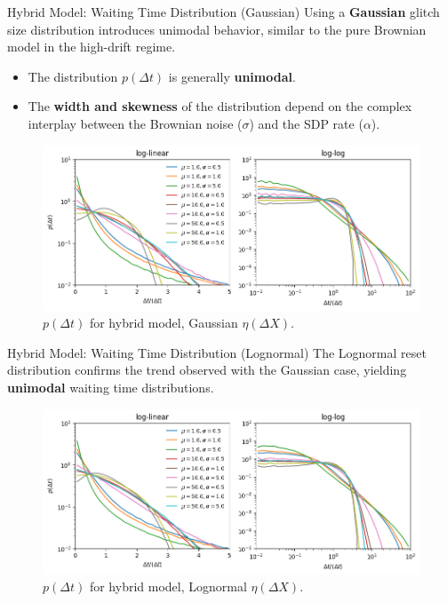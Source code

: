 \begin{frame}{Hybrid Model: Waiting Time Distribution (Gaussian)}
    Using a \textbf{Gaussian} glitch size distribution introduces unimodal behavior, similar to the pure Brownian model in the high-drift regime.

    \begin{itemize}
        \item The distribution $p(\Delta t)$ is generally \textbf{unimodal}.
        \item The \textbf{width and skewness} of the distribution depend on the complex interplay between the Brownian noise ($\sigma$) and the SDP rate ($\alpha$).
    \end{itemize}
    \vspace{-0.5em}
    \begin{figure}
        \centering
        \includegraphics[width=0.85\linewidth]{assets/wtd_gaussian_hybrid.png}
        \vspace{-1em}
        \caption{$p(\Delta t)$ for hybrid model, Gaussian $\eta(\Delta X)$.}
    \end{figure}
\end{frame}

\begin{frame}{Hybrid Model: Waiting Time Distribution (Lognormal)}
    The Lognormal reset distribution confirms the trend observed with the Gaussian case, yielding \textbf{unimodal} waiting time distributions.
    
    \begin{figure}
        \centering
        \includegraphics[width=0.85\linewidth]{assets/wtd_lognormal_hybrid.png}
        \vspace{-1em}
        \caption{$p(\Delta t)$ for hybrid model, Lognormal $\eta(\Delta X)$.}
    \end{figure}
\end{frame}